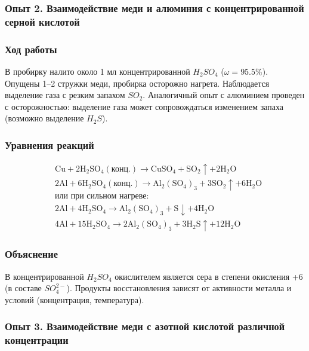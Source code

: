 \documentclass[a4paper,12pt]{article}
\begin{document}
	\subsubsection*{Опыт 2. Взаимодействие меди и алюминия с концентрированной серной кислотой}
	
	\subsubsection*{Ход работы}
	
	\quad В пробирку налито около 1 мл концентрированной \(H_2SO_4\) (\(\omega = 95.5\%\)). Опущены 1–2 стружки меди, пробирка осторожно нагрета. Наблюдается выделение газа с резким запахом \(SO_2\). Аналогичный опыт с алюминием проведен с осторожностью: выделение газа может сопровождаться изменением запаха (возможно выделение \(H_2S\)).
	
	\subsubsection*{Уравнения реакций}
	\begin{align*}
		& \text{Cu} + 2\text{H}_2\text{SO}_4 (\text{конц.}) \rightarrow \text{CuSO}_4 + \text{SO}_2 \uparrow + 2\text{H}_2\text{O} \\
		& 2\text{Al} + 6\text{H}_2\text{SO}_4 (\text{конц.}) \rightarrow \text{Al}_2(\text{SO}_4)_3 + 3\text{SO}_2 \uparrow + 6\text{H}_2\text{O} \\
		& \text{или при сильном нагреве:} \\
		& 2\text{Al} + 4\text{H}_2\text{SO}_4 \rightarrow \text{Al}_2(\text{SO}_4)_3 + \text{S} \downarrow + 4\text{H}_2\text{O} \\
		& 4\text{Al} + 15\text{H}_2\text{SO}_4 \rightarrow 2\text{Al}_2(\text{SO}_4)_3 + 3\text{H}_2\text{S} \uparrow + 12\text{H}_2\text{O}
	\end{align*}
	
	\subsubsection*{Объяснение}
		
	\quad В концентрированной \(H_2SO_4\) окислителем является сера в степени окисления +6 (в составе \(SO_4^{2-}\)). Продукты восстановления зависят от активности металла и условий (концентрация, температура).
	
	\subsubsection*{Опыт 3. Взаимодействие меди с азотной кислотой различной концентрации}
	
\end{document}
